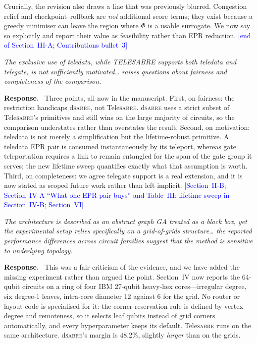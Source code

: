 \documentclass[11pt]{article}
\newcommand{\dSABRE}{d\textsc{sabre}}
\newcommand{\TeleSABRE}{Tele\textsc{sabre}}
\newenvironment{comment}{\medskip\noindent\itshape}{\par}
\newcommand{\response}{\smallskip\noindent\textbf{Response.}\ }
\newcommand{\where}[1]{\textcolor{blue}{[#1]}}
\begin{document}
Crucially, the revision also draws a line that was previously blurred.
Congestion relief and checkpoint--rollback are \emph{not} additional
score terms; they exist because a greedy minimiser can leave the region
where $\Phi$ is a usable surrogate.  We now say so explicitly and
report their value as feasibility rather than EPR reduction.
\where{end of Section~III-A; Contributions bullet~3}

\begin{comment}
The exclusive use of teledata, while TELESABRE supports both teledata
and telegate, is not sufficiently motivated\ldots{} raises questions
about fairness and completeness of the comparison.
\end{comment}

\response
Three points, all now in the manuscript.  First, on fairness: the
restriction handicaps \dSABRE{}, not \TeleSABRE{}.  \dSABRE{} uses a
strict subset of \TeleSABRE{}'s primitives and still wins on the large
majority of circuits, so the comparison understates rather than
overstates the result.  Second, on motivation: teledata is not merely a
simplification but the lifetime-robust primitive.  A teledata EPR pair
is consumed instantaneously by its teleport, whereas gate teleportation
requires a link to remain entangled for the span of the gate group it
serves; the new lifetime sweep quantifies exactly what that assumption
is worth.  Third, on completeness: we agree telegate support is a real
extension, and it is now stated as scoped future work rather than left
implicit.
\where{Section~II-B; Section~IV-A ``What one EPR pair buys'' and
Table~III; lifetime sweep in Section~IV-B; Section~VI}

\begin{comment}
The architecture is described as an abstract graph GA treated as a
black box, yet the experimental setup relies specifically on a grid-of-grids
structure\ldots{} the reported performance differences across circuit
families suggest that the method is sensitive to underlying topology.
\end{comment}

\response
This was a fair criticism of the evidence, and we have added the
missing experiment rather than argued the point.  Section~IV now
reports the 64-qubit circuits on a ring of four IBM 27-qubit heavy-hex
cores---irregular degree, six degree-1 leaves, intra-core diameter 12
against 6 for the grid.  No router or layout code is specialised for
it: the corner-reservation rule is defined by vertex degree and
remoteness, so it selects leaf qubits instead of grid corners
automatically, and every hyperparameter keeps its default.
\TeleSABRE{} runs on the same architecture.  \dSABRE{}'s margin is
$48.2\%$, slightly \emph{larger} than on the grids.
\end{document}
